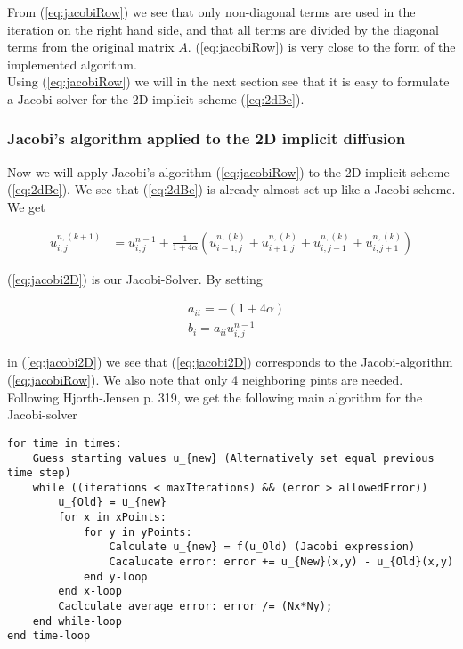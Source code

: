 \documentclass{article}
\begin{document}
From (\ref{eq:jacobiRow}) we see that only non-diagonal terms are used in the iteration on the right hand side, and that all terms are divided by the diagonal terms from the original matrix $A$. (\ref{eq:jacobiRow}) is very close to the form of the implemented algorithm.\\

Using (\ref{eq:jacobiRow}) we will in the next section see that it is easy to formulate a Jacobi-solver for the 2D implicit scheme (\ref{eq:2dBe}).

\subsubsection{Jacobi's algorithm applied to the 2D implicit diffusion}
Now we will apply Jacobi's algorithm (\ref{eq:jacobiRow}) to the 2D implicit scheme (\ref{eq:2dBe}). We see that (\ref{eq:2dBe}) is already almost set up like a Jacobi-scheme. We get

\begin{subequations}\label{eq:jacobi2D}
	\begin{align}
				u_{i,j}^{n,(k+1)} &= u_{i,j}^{n-1}  + \frac{1}{1+4\alpha}(u_{i-1,j}^{n, (k)} 
		+ u_{i+1,j}^{n,(k)} + u_{i,j-1}^{n,(k)} + u_{i,j+1}^{n,(k)})
	\end{align}
\end{subequations}

(\ref{eq:jacobi2D}) is our Jacobi-Solver. By setting

\begin{subequations}
	\begin{align}
		&a_{ii} = -(1 + 4\alpha)\\
		&b_i = a_{ii} u_{i,j}^{n-1}
	\end{align}
\end{subequations}

in (\ref{eq:jacobi2D}) we see that (\ref{eq:jacobi2D}) corresponds to the Jacobi-algorithm (\ref{eq:jacobiRow}). We also note that only 4 neighboring pints are needed.\\

Following Hjorth-Jensen \cite{MHJ} p. 319, we get the following main algorithm for the Jacobi-solver

\begin{lstlisting}
for time in times:
	Guess starting values u_{new} (Alternatively set equal previous time step)
    while ((iterations < maxIterations) && (error > allowedError))
	    u_{Old} = u_{new}
		for x in xPoints:
			for y in yPoints:
				Calculate u_{new} = f(u_Old) (Jacobi expression)
				Cacalucate error: error += u_{New}(x,y) - u_{Old}(x,y)
			end y-loop
		end x-loop
		Caclculate average error: error /= (Nx*Ny);
	end while-loop
end time-loop
\end{lstlisting}
\end{document}
